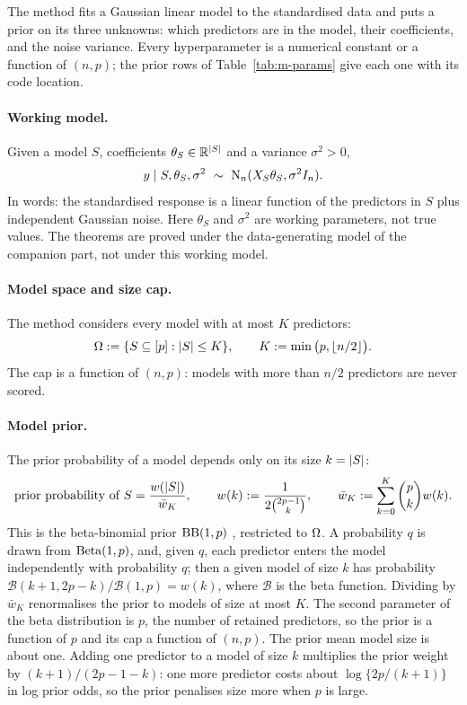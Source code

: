 \documentclass[11pt]{article}
\begin{document}
The method fits a Gaussian linear model to the standardised data and puts a prior on its three unknowns: which
predictors are in the model, their coefficients, and the noise variance. Every hyperparameter is a numerical constant
or a function of $(n,p)$; the prior rows of Table~\ref{tab:m-params} give each one with its code location.

\paragraph{Working model.} Given a model $S$, coefficients $\theta_S\in\mathbb{R}^{\lvert S\rvert}$ and a variance $\sigma^2>0$,
\begin{equation}\label{eq:m-working}
  y\mid S,\theta_S,\sigma^2\ \sim\ \Normal_n(X_S\theta_S,\sigma^2I_n).
\end{equation}
In words: the standardised response is a linear function of the predictors in $S$ plus independent Gaussian noise. Here
$\theta_S$ and $\sigma^2$ are working parameters, not true values. The theorems are proved under the data-generating
model of the companion part, not under this working model.

\paragraph{Model space and size cap.} The method considers every model with at most $K$ predictors:
\begin{equation}\label{eq:m-space}
  \Omega:=\{S\subseteq[p]:\lvert S\rvert\le K\},\qquad K:=\min\big(p,\lfloor n/2\rfloor\big).
\end{equation}
The cap is a function of $(n,p)$: models with more than $n/2$ predictors are never scored.

\paragraph{Model prior.} The prior probability of a model depends only on its size $k=\lvert S\rvert$:
\begin{equation}\label{eq:m-modelprior}
  \text{prior probability of }S=\frac{w(\lvert S\rvert)}{\bar w_K},\qquad w(k):=\frac{1}{2\binom{2p-1}{k}},\qquad
  \bar w_K:=\sum_{k=0}^{K}\binom{p}{k}w(k).
\end{equation}
This is the beta-binomial prior $\mathrm{BB}(1,p)$ \citep{ScottBerger2010}, restricted to $\Omega$. A probability $q$ is drawn from
$\mathrm{Beta}(1,p)$, and, given $q$, each predictor enters the model independently with probability $q$; then a given model
of size $k$ has probability $\mathcal B(k+1,2p-k)/\mathcal B(1,p)=w(k)$, where $\mathcal B$ is the beta function. Dividing by
$\bar w_K$ renormalises the prior to models of size at most $K$. The second parameter of the beta distribution is $p$, the
number of retained predictors, so the prior is a function of $p$ and its cap a function of $(n,p)$. The prior mean model
size is about one. Adding one predictor to a model of size $k$ multiplies the prior weight by $(k+1)/(2p-1-k)$: one more
predictor costs about $\log\{2p/(k+1)\}$ in log prior odds, so the prior penalises size more when $p$ is large.
\end{document}
